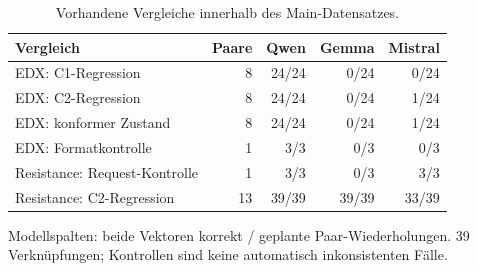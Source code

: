 \begin{table}[htbp]
\centering\small
\caption{Vorhandene Vergleiche innerhalb des Main-Datensatzes.}
\label{tab_v2_pairs}
\begin{tabular}{lrrrr}
\toprule
Vergleich & Paare & Qwen & Gemma & Mistral \\
\midrule
EDX: C1-Regression & 8 & 24/24 & 0/24 & 0/24 \\
EDX: C2-Regression & 8 & 24/24 & 0/24 & 1/24 \\
EDX: konformer Zustand & 8 & 24/24 & 0/24 & 1/24 \\
EDX: Formatkontrolle & 1 & 3/3 & 0/3 & 0/3 \\
Resistance: Request-Kontrolle & 1 & 3/3 & 0/3 & 3/3 \\
Resistance: C2-Regression & 13 & 39/39 & 39/39 & 33/39 \\
\bottomrule
\end{tabular}
\par\smallskip\noindent
\begin{minipage}{\linewidth}\footnotesize Modellspalten: beide Vektoren korrekt / geplante Paar-Wiederholungen. 39 Verknüpfungen; Kontrollen sind keine automatisch inkonsistenten Fälle.\end{minipage}
\end{table}
